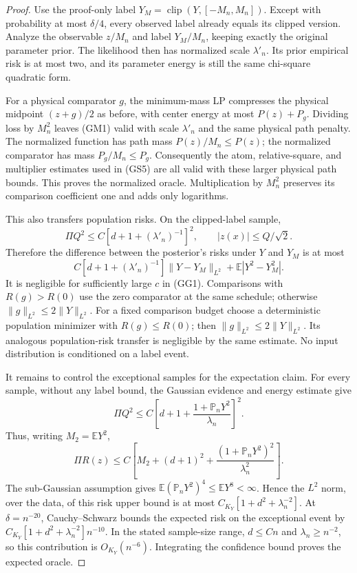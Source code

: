 \begin{proof}
Use the proof-only label $Y_M=\operatorname{clip}(Y,[-M_n,M_n])$.
Except with probability at most $\delta/4$, every observed label
already equals its clipped version. Analyze the observable $z/M_n$
and label $Y_M/M_n$, keeping exactly the original parameter prior.
The likelihood then has normalized scale $\lambda'_n$.
Its prior empirical risk is at most two, and its parameter energy
is still the same chi-square quadratic form.

For a physical comparator $g$, the minimum-mass LP compresses the
physical midpoint $(z+g)/2$ as before, with center energy at most
$P(z)+P_g$. Dividing loss by $M_n^2$ leaves (GM1) valid with
scale $\lambda'_n$ and the same physical path penalty.
The normalized function has path mass $P(z)/M_n\le P(z)$;
the normalized comparator has mass $P_g/M_n\le P_g$.
Consequently the atom, relative-square, and multiplier estimates
used in (GS5) are all valid with these larger physical path bounds.
This proves the normalized oracle. Multiplication by $M_n^2$
preserves its comparison coefficient one and adds only logarithms.

This also transfers population risks. On the clipped-label sample,
\[
 \Pi Q^2\le C[d+1+(\lambda'_n)^{-1}]^2,\qquad
 |z(x)|\le Q/\sqrt2.
\]
Therefore the difference between the posterior's risks under $Y$
and $Y_M$ is at most
\[
 C[d+1+(\lambda'_n)^{-1}]
       \|Y-Y_M\|_{L^2}+\mathbb E|Y^2-Y_M^2|.
\]
It is negligible for sufficiently large $c$ in (GG1).
Comparisons with $R(g)>R(0)$ use the zero comparator at the same
schedule; otherwise $\|g\|_{L^2}\le2\|Y\|_{L^2}$.
For a fixed comparison budget choose a deterministic population minimizer with
$R(g)\le R(0)$; then $\|g\|_{L^2}\le2\|Y\|_{L^2}$.
Its analogous population-risk transfer is negligible by the same
estimate. No input distribution is conditioned on a label event.

It remains to control the exceptional samples for the expectation
claim. For every sample, without any label bound, the Gaussian
evidence and energy estimate give
\[
 \Pi Q^2\le
 C\left[d+1+\frac{1+\mathbb P_nY^2}{\lambda_n}\right]^2.
\]
Thus, writing $M_2=\mathbb EY^2$,
\[
 \Pi R(z)\le C\left[M_2+(d+1)^2+
                \frac{(1+\mathbb P_nY^2)^2}{\lambda_n^2}\right].
\]
The sub-Gaussian assumption gives
$\mathbb E(\mathbb P_nY^2)^4\le\mathbb EY^8<\infty$.
Hence the $L^2$ norm, over the data, of this risk upper bound is at
most $C_{K_Y}[1+d^2+\lambda_n^{-2}]$.
At $\delta=n^{-20}$, Cauchy--Schwarz bounds the expected risk on
the exceptional event by
$C_{K_Y}[1+d^2+\lambda_n^{-2}]n^{-10}$.
In the stated sample-size range, $d\le Cn$ and
$\lambda_n\ge n^{-2}$, so this contribution is $O_{K_Y}(n^{-6})$.
Integrating the confidence bound proves the expected oracle.
\end{proof}

